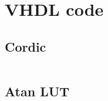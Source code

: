 \chapter{VHDL code}


\section{Cordic}

\begin{code}
    \inputminted{vhdl}{../vhdl/src/CORDIC.vhd}
    \label{code:vhdl}
\end{code}


\section{Atan LUT}
\begin{code}
    \inputminted{vhdl}{../vhdl/src/ATAN_LUT.vhd}
    \label{code:lut}
\end{code}
